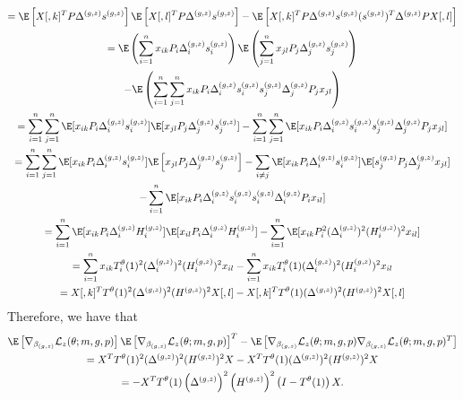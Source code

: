 \documentclass[11pt]{article}
\begin{document}
\begin{appendices}
\begin{refsection}
\begin{multline*}
= \E\left[{X}[,k]^T P \Delta^{(g,z)} s^{(g,z)} \right] \E \left[ {X}[,l]^T P \Delta^{(g,z)} s^{(g,z)} \right] - \E \left[ {X}[,k]^T P \Delta^{(g,z)} s^{(g,z)} (s^{(g,z)})^T \Delta^{(g,z)} P {X}[,l ] \right] \\
=\E\left(\sum_{i=1}^n {x}_{ik} P_i \Delta^{(g,z)}_i s^{(g,z)}_{i} \right) \E \left( \sum_{j=1}^n {x}_{jl} P_j \Delta^{(g,z)}_j s^{(g,z)}_j \right) \\ - \E \left( \sum_{i=1}^n \sum_{j=1}^n {x}_{ik} P_i \Delta^{(g,z)}_i s^{(g,z)}_i s^{(g,z)}_j \Delta^{(g,z)}_j P_j{x}_{jl} \right) \\ 
= \sum_{i=1}^n \sum_{j=1}^n \E[ {x}_{ik} P_i \Delta^{(g,z)}_is^{(g,z)}_i] \E [ {x}_{jl} P_j \Delta^{(g,z)}_j s^{(g,z)}_j]  -  \sum_{i=1}^n \sum_{j=1}^n \E [ {x}_{ik} P_i \Delta^{(g,z)}_i s^{(g,z)}_i s^{(g,z)}_j \Delta^{(g,z)}_jP_j {x}_{jl}  ]  \\
= \sum_{i=1}^n \sum_{j=1}^n \E[ {x}_{ik} P_i \Delta^{(g,z)}_i s^{(g,z)}_i ] \E \left[{x}_{jl} P_j \Delta^{(g,z)}_j s^{(g,z)}_j \right]  - \sum_{i \neq j} \E [{x}_{ik} P_i \Delta^{(g,z)}_i s^{(g,z)}_i] \E[s^{(g,z)}_j P_j \Delta^{(g,z)}_j {x}_{jl}] \\ - \sum_{i=1}^n \E[ {x}_{ik}P_i \Delta^{(g,z)}_i s^{(g,z)}_i s^{(g,z)}_i \Delta^{(g,z)}_i P_i{x}_{il}] \\ 
= \sum_{i=1}^n \E[ {x}_{ik} P_i \Delta^{(g,z)}_i H^{(g,z)}_i] \E[{x}_{il}P_i\Delta^{(g,z)}_i H^{(g,z)}_i] - \sum_{i=1}^n \E[{x}_{ik}P_i^2(\Delta^{(g,z)}_i)^2 (H^{(g,z)}_i)^2 {x}_{il}] \\ = \sum_{i=1}^n {x}_{ik} T_i^{\theta}(1)^2(\Delta^{(g,z)}_i)^2 (H_i^{(g,z)})^2{x}_{il} - \sum_{i=1}^n {x}_{ik} T_i^{\theta}(1) (\Delta_i^{(g,z)})^2 (H_i^{(g,z)})^2 {x}_{il} \\ = {X}[,k]^T T^{\theta}(1)^2 (\Delta^{(g,z)})^2 (H^{(g,z)})^2 {X}[,l] - {X}[,k]^T T^{\theta}(1) (\Delta^{(g,z)})^2 (H^{(g,z)})^2 {X}[,l]
\end{multline*}
Therefore, we have that
\begin{multline}\label{sub_mat_3_zeroinf_2}
\E\left[ \nabla_{\beta_{(g,z)}} \mathcal{L}_z(\theta; m, g, p) \right] \E\left[\nabla_{\beta_{(g,z)}} \mathcal{L}_z(\theta; m, g, p) \right]^T - \E\left[ \nabla_{\beta_{(g,z)}} \mathcal{L}_z(\theta; m, g, p) \nabla_{\beta_{(g,z)}} \mathcal{L}_z(\theta; m, g, p)^T \right] \\ = 
X^T T^{\theta}(1)^2 (\Delta^{(g,z)})^2(H^{(g,z)})^2{X} - {X}^T T^{\theta}(1) (\Delta^{(g,z)})^2 (H^{(g,z)})^2 {X} \\ = - X^T T^{\theta}(1) \left(\Delta^{(g,z)}\right)^2 \left( H^{(g,z)} \right)^2 \left( I - T^{\theta}(1)  \right) X.

\end{multline}
\end{refsection}
\end{appendices}
\end{document}
